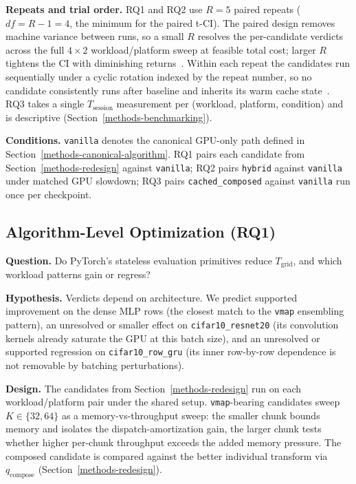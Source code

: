 \textbf{Repeats and trial order.} RQ1 and RQ2 use $R=5$
paired repeats ($df=R-1=4$, the minimum for the paired
t-CI). The paired design removes machine variance between runs,
so a small $R$ resolves the per-candidate verdicts across the
full $4\times 2$ workload/platform sweep at feasible total
cost; larger $R$ tightens the CI with diminishing
returns~\cite{kalibera2013rigorous}. Within each repeat the candidates run sequentially
under a cyclic rotation indexed by the repeat number, so no
candidate consistently runs after baseline and inherits its
warm cache
state~\cite{kalibera2013rigorous}. RQ3 takes a single
$T_{\text{session}}$ measurement per (workload, platform,
condition) and is descriptive
(Section~\ref{methods-benchmarking}).

\textbf{Conditions.} \texttt{vanilla} denotes the canonical
GPU-only path defined in
Section~\ref{methods-canonical-algorithm}. RQ1 pairs each
candidate from Section~\ref{methods-redesign} against
\texttt{vanilla}; RQ2 pairs \texttt{hybrid} against
\texttt{vanilla} under matched GPU slowdown; RQ3 pairs
\texttt{cached\_composed} against \texttt{vanilla} run
once per checkpoint.

\subsection{Algorithm-Level Optimization
(RQ1)}\label{experiment-1-algorithm}

\textbf{Question.} Do PyTorch's stateless evaluation
primitives reduce $T_{\text{grid}}$, and which workload
patterns gain or regress?

\textbf{Hypothesis.} Verdicts depend on architecture. We
predict supported improvement on the dense MLP rows (the
closest match to the \texttt{vmap} ensembling pattern), an
unresolved or smaller effect on \texttt{cifar10\_resnet20}
(its convolution kernels already saturate the GPU at this
batch size), and an unresolved or supported regression on
\texttt{cifar10\_row\_gru} (its inner row-by-row dependence
is not removable by batching perturbations).

\textbf{Design.} The candidates from
Section~\ref{methods-redesign} run on each workload/platform
pair under the shared setup. \texttt{vmap}-bearing
candidates sweep $K\in\{32,64\}$ as a memory-vs-throughput
sweep: the smaller chunk bounds memory and isolates the
dispatch-amortization gain, the larger chunk tests whether
higher per-chunk throughput exceeds the added memory
pressure. The composed candidate is compared against the
better individual transform via $q_{\text{compose}}$
(Section~\ref{methods-redesign}).

